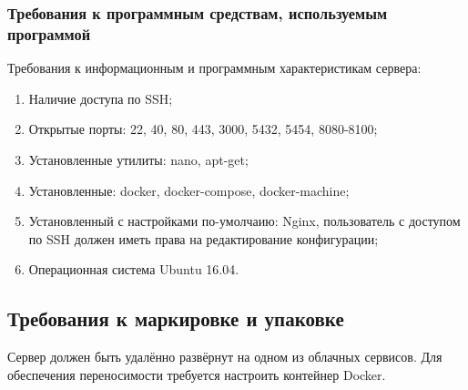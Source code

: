 \subsubsection{Требования к программным средствам, используемым программой}
Требования к информационным и программным характеристикам сервера:
\begin{enumerate}[noitemsep]
    \item Наличие доступа по SSH;
    \item Открытые порты: 22, 40, 80, 443, 3000, 5432, 5454, 8080-8100;
    \item Установленные утилиты: nano, apt-get;
    \item Установленные: docker, docker-compose, docker-machine;
    \item Установленный с настройками по-умолчаию: Nginx, пользователь с доступом по SSH должен иметь права
    на редактирование конфигурации;
    \item Операционная система Ubuntu 16.04.
\end{enumerate}

\subsection{Требования к маркировке и упаковке}

Сервер должен быть удалённо развёрнут на одном из облачных сервисов.
Для обеспечения переносимости требуется настроить контейнер Docker.